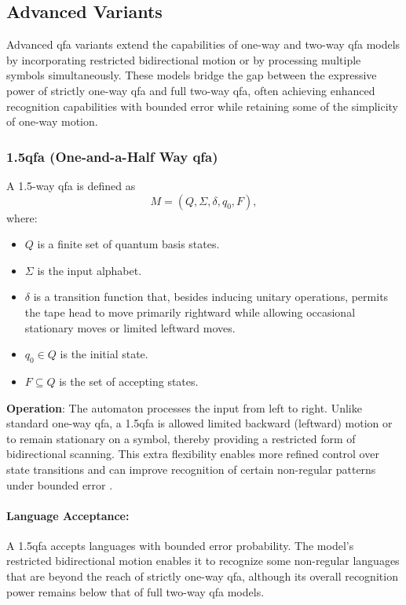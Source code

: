 \subsection{Advanced Variants}
\label{subsec:advanced-variants}

Advanced qfa variants extend the capabilities of one-way and two-way qfa models by incorporating restricted bidirectional motion or by processing multiple symbols simultaneously. These models bridge the gap between the expressive power of strictly one-way qfa and full two-way qfa, often achieving enhanced recognition capabilities with bounded error while retaining some of the simplicity of one-way motion.

\subsubsection{1.5qfa (One-and-a-Half Way qfa)}
\label{sssec:1.5qfa}
\begin{definition}[1.5qfa]
A 1.5-way qfa is defined as 
\[
M = (Q, \Sigma, \delta, q_0, F),
\]
where:
\begin{itemize}
    \item \( Q \) is a finite set of quantum basis states.
    \item \( \Sigma \) is the input alphabet.
    \item \( \delta \) is a transition function that, besides inducing unitary operations, permits the tape head to move primarily rightward while allowing occasional stationary moves or limited leftward moves.
    \item \( q_0 \in Q \) is the initial state.
    \item \( F \subseteq Q \) is the set of accepting states.
\end{itemize}
\end{definition}

\textbf{Operation}:  
The automaton processes the input from left to right. Unlike standard one-way qfa, a 1.5qfa is allowed limited backward (leftward) motion or to remain stationary on a symbol, thereby providing a restricted form of bidirectional scanning. This extra flexibility enables more refined control over state transitions and can improve recognition of certain non-regular patterns under bounded error \cite{kondacs1997power}.

\paragraph{Language Acceptance:}  
A 1.5qfa accepts languages with bounded error probability. The model’s restricted bidirectional motion enables it to recognize some non-regular languages that are beyond the reach of strictly one-way qfa, although its overall recognition power remains below that of full two-way qfa models.

